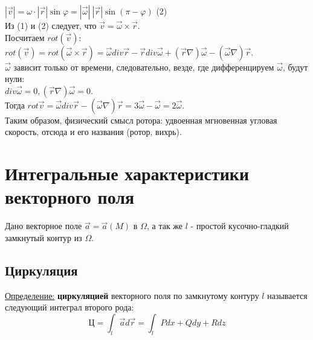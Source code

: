\documentclass[12pt]{article}
\begin{document}
$|\overrightarrow{v}| = \omega \cdot |\overrightarrow{r}| \sin \varphi = |\overrightarrow{\omega}| \ |\overrightarrow{r}| \sin (\pi - \varphi)$ (2)\\
Из (1) и (2) следует, что $\overrightarrow{v} = \overrightarrow{\omega} \times \overrightarrow{r}$.\\
Посчитаем $rot (\overrightarrow{v})$:\\
$rot(\overrightarrow{v})=rot(\overrightarrow{\omega} \times \overrightarrow{r}) = \overrightarrow{\omega} div \overrightarrow{r} - \overrightarrow{r} div \overrightarrow{\omega} + (\overrightarrow{r} \nabla) \overrightarrow{\omega} - (\overrightarrow{\omega} \nabla) \overrightarrow{r}$.\\
$\overrightarrow{\omega}$ зависит только от времени, следовательно, везде, где дифференцируем $\overrightarrow{\omega}$, будут нули:\\
$div \overrightarrow{\omega} = 0, (\overrightarrow{r} \nabla) \overrightarrow{\omega} = 0$.\\
Тогда $rot \overrightarrow{v} = \overrightarrow{\omega} div \overrightarrow{r} - (\overrightarrow{\omega} \nabla)\overrightarrow{r} = 3\overrightarrow{\omega} - \overrightarrow{\omega} = 2\overrightarrow{\omega}$.\\
Таким образом, физический смысл ротора: удвоенная мгновенная угловая скорость, отсюда и его названия (ротор, вихрь).\\
\section{Интегральные характеристики векторного поля}
Дано векторное поле $\overrightarrow{a} = \overrightarrow{a}(M)$ в $\Omega$, а так же $l$ - простой кусочно-гладкий замкнутый контур из $\Omega$.\\
\subsection{Циркуляция}
\uline{Определение:} \textbf{циркуляцией} векторного поля по замкнутому контуру $l$ называется следующий интеграл второго рода:\\
$$\text{Ц} = \int_l \overrightarrow{a} d\overrightarrow{r} = \int_l Pdx + Qdy + Rdz$$
\end{document}
